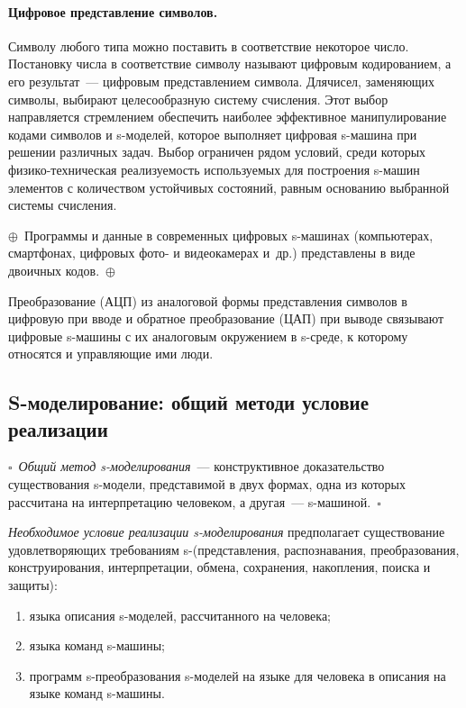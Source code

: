 \begin{multicols}{2}
\paragraph*{Цифровое представление символов.}Символу
лю\-бо\-го типа можно поставить в соответствие некоторое число. Постановку 
числа в соответствие символу называют цифровым кодированием, а его 
результат~--- цифровым представлением символа. Для\linebreak чисел, заменяющих 
символы, выбирают целесообразную систему счис\-ле\-ния. Этот выбор 
на\-прав\-ля\-ет\-ся стремлением обеспечить наиболее эффективное 
манипулирование кодами символов и s-мо\-де\-лей, которое выполняет цифровая 
s-ма\-ши\-на при решении различных задач. Выбор ограничен рядом условий, среди 
которых фи\-зи\-ко-тех\-ни\-че\-ская реализуемость используемых для построения 
s-ма\-шин элементов с количеством устойчивых состояний, равным основанию 
выбранной системы счисления.

\noindent
$\oplus$~Программы и данные в современных
цифровых s-машинах (компьютерах, смартфонах, цифровых фото- и
видеокамерах и~др.) представлены в виде двоичных кодов.~$\oplus$

Преобразование
(АЦП) из аналоговой формы представления символов в цифровую при вводе и
обратное преобразование (ЦАП) при выводе связывают цифровые s-машины с
их аналоговым окружением в s-среде, к которому относятся и управляющие
ими люди.

\subsection{S-моделирование: общий метод\newline и условие реализации} %

\noindent $\square$~\textit{Общий метод s-моделирования}~--- конструктивное 
доказательство существования s-мо\-де\-ли, представимой в двух формах, одна из 
которых рассчитана на интерпретацию человеком, а другая~--- 
s-ма\-ши\-ной.~$\square$

\textit{Необходимое условие реализации s-моделирования} предполагает
существование удов\-ле\-тво\-ря\-ющих требованиям s-(представления,
распознавания, преобразования, конструирования, интерпретации, обмена,
сохранения, накопления, поиска и защиты):
\begin{enumerate}[(1)]
\item языка описания s-моделей, рассчитанного на человека;
\item языка команд s-машины;
\item программ s-преобразования s-моделей на языке для человека в описания
на языке команд s-машины.
\end{enumerate}


\end{multicols}
